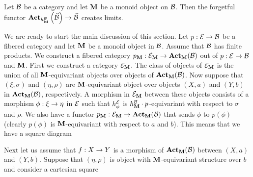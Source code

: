 \begin{corollary}\label{corollary:creation_of_limits_for_actions_on_presheaf_category}
Let ${\mathcal B}$ be a category and let $\mathbf{M}$ be a monoid object on ${\mathcal B}$. Then the forgetful functor $\mathbf{Act}_{h^{{\mathcal B}}_{\mathbf{M}}}\left(\widehat{{\mathcal B}}\right)\rightarrow \widehat{{\mathcal B}}$ creates limits.
\end{corollary}
\noindent
We are ready to start the main discussion of this section. Let $p:{\mathcal E}\rightarrow {\mathcal B}$ be a fibered category and let $\mathbf{M}$ be a monoid object in ${\mathcal B}$. Assume that ${\mathcal B}$ has finite products. We construct a fibered category $p_{\mathbf{M}}:{\mathcal E}_{\mathbf{M}}\rightarrow \mathbf{Act}_{\mathbf{M}}({\mathcal B})$ out of $p:{\mathcal E}\rightarrow {\mathcal B}$ and $\mathbf{M}$. First we construct a category ${\mathcal E}_{\mathbf{M}}$. The class of objects of ${\mathcal E}_{\mathbf{M}}$ is the union of all $\mathbf{M}$-equivariant objects over objects of $\mathbf{Act}_{\mathbf{M}}({\mathcal B})$. Now suppose that $(\xi,\sigma)$ and $(\eta,\rho)$ are $\mathbf{M}$-equivariant object over objects $(X,a)$ and $(Y,b)$ in $\mathbf{Act}_{\mathbf{M}}({\mathcal B})$, respectively. A morphism in ${\mathcal E}_{\mathbf{M}}$ between these objects consists of a morphism $\phi:\xi\rightarrow \eta$ in ${\mathcal E}$ such that $h^{{\mathcal E}}_{\phi}$ is $h^{{\mathcal B}}_{\mathbf{M}}\cdot p$-equivariant with respect to $\sigma$ and $\rho$. We also have a functor $p_{\mathbf{M}}:{\mathcal E}_{\mathbf{M}}\rightarrow \mathbf{Act}_{\mathbf{M}}({\mathcal B})$ that sends $\phi$ to $p(\phi)$ (clearly $p(\phi)$ is $\mathbf{M}$-equivariant with respect to $a$ and $b$). This means that we have a square diagram
\begin{center}
\end{center}
Next let us assume that $f:X\rightarrow Y$ is a morphism of $\mathbf{Act}_{\mathbf{M}}({\mathcal B})$ between $(X,a)$ and $(Y,b)$. Suppose that $(\eta,\rho)$ is object with $\mathbf{M}$-equivariant structure over $b$ and consider a cartesian square
\begin{center}
\end{center}
